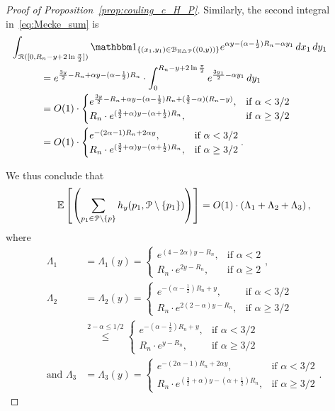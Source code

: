 \begin{proof}[Proof of Proposition~\ref{prop:couling_c_H_P}]
Similarly, the second integral in~\eqref{eq:Mecke_sum} is
\begin{align*}
	&\hspace{-30pt}\int_{\Rcal ([0, R_n - y + 2 \ln \frac{\pi}{2}])} \ind{(x_1,y_1) \in \BallSym{(0,y)}} e^{\alpha y - (\alpha - \frac{1}{2})R_n - \alpha y_1} \, dx_1 \, dy_1\\
	&= e^{\frac{3y}{2} - R_n + \alpha y - (\alpha - \frac{1}{2})R_n} 
    	\cdot \int_{0}^{R_n - y + 2 \ln \frac{\pi}{2}} e^{\frac{3y_1}{2}-\alpha y_1} \, dy_1\\
	&= O(1)\cdot 
	\begin{cases} 
	e^{\frac{3y}{2} - R_n + \alpha y - (\alpha - \frac{1}{2})R_n + (\frac{3}{2} - \alpha)(R_n-y)} 
	, & \mbox{if $\alpha < 3/2$} \\ 
	R_n \cdot e^{(\frac{3}{2} +\alpha)y -  (\alpha + \frac{1}{2})R_n}, & \mbox{if 
	$\alpha \geq 3/2$}
	\end{cases}	\\
	&= O(1) \cdot 
	\begin{cases}
	  e^{-(2\alpha-1) R_n + 2 \alpha y}, & \mbox{if $\alpha < 3/2$} \\
	  R_n \cdot e^{(\frac{3}{2} +\alpha)y -  (\alpha + \frac{1}{2})R_n}, & \mbox{if 
	$\alpha \geq 3/2$}
	\end{cases}.
\end{align*}

We thus conclude that 
\begin{equation} \label{eq:upper_bound_faulty_edges} 
\mathbb{E}\left[\left( \sum_{p_1 \in {\mathcal P} \setminus\{p\}} 
		h_y (p_1, {\mathcal P} \setminus \{ p_1 \})\right)\right]  = O(1) \cdot 
\left( \Lambda_1 + \Lambda_2 + \Lambda_3 \right),
\end{equation}
where 
\begin{align*}
 \Lambda_1 &= \Lambda_1 (y) =\begin{cases}
	e^{(4-2\alpha) y - R_n}, & \mbox{if $\alpha < 2$} \\
	R_n \cdot e^{2y - R_n}, & \mbox{if $\alpha \geq 2$}
	\end{cases},  \\
\Lambda_2 &= \Lambda_2 (y) = 
\begin{cases}
	e^{-(\alpha - \frac{1}{2})R_n +y}, & \mbox{if $\alpha < 3/2$} \\
	R_n \cdot  e^{2(2-\alpha)y - R_n}, & \mbox{if $\alpha \geq 3/2$}
	\end{cases} \\
	&\stackrel{2-\alpha \leq 1/2}{\leq}
	\begin{cases}
	e^{-(\alpha - \frac{1}{2})R_n +y}, & \mbox{if $\alpha < 3/2$} \\
	R_n \cdot  e^{y - R_n}, & \mbox{if $\alpha \geq 3/2$}
	\end{cases}\\
\mbox{and } \Lambda_3 &= \Lambda_3 (y) = 
\begin{cases}
	  e^{-(2\alpha-1) R_n + 2 \alpha y}, & \mbox{if $\alpha < 3/2$} \\
	  R_n \cdot e^{(\frac{3}{2} +\alpha)y -  (\alpha + \frac{1}{2})R_n}, & \mbox{if 
	$\alpha \geq 3/2$}
	\end{cases}.
\end{align*}


\end{proof}
